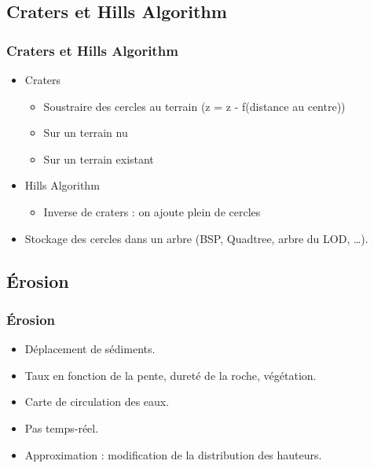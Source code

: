 \documentclass{beamer}
\begin{document}
\subsection{Craters et Hills Algorithm}
\begin{frame}
  \frametitle{Craters et Hills Algorithm}
  \begin{itemize}
  \item Craters
    \begin{itemize}
    \item Soustraire des cercles au terrain (z = z - f(distance au centre))
    \item Sur un terrain nu
    \item Sur un terrain existant
    \end{itemize}
  \item Hills Algorithm
    \begin{itemize}
    \item Inverse de craters : on ajoute plein de cercles
    \end{itemize}
  \item Stockage des cercles dans un arbre (BSP, Quadtree, arbre du LOD, \dots{}).
  \end{itemize}
\end{frame}

\subsection{Érosion}

\begin{frame}
  \frametitle{Érosion}
  \begin{itemize}
  \item Déplacement de sédiments.
  \item Taux en fonction de la pente, dureté de la roche, végétation.
  \item Carte de circulation des eaux.
  \item Pas temps-réel.
  \item Approximation : modification de la distribution des hauteurs. %
  \end{itemize}
\end{frame}
\end{document}
